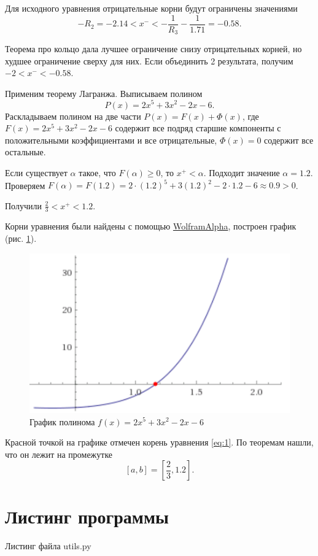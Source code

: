 Для исходного уравнения отрицательные корни будут ограничены значениями
$$- R_2 =
- 2.14 <
x^{-} <
- \frac{1}{R_3} 
- \frac{1}{1.71} =
- 0.58.$$

Теорема про кольцо дала лучшее ограничение снизу отрицательных корней, но худшее ограничение сверху для них.
Если объединить 2 результата, получим $- 2 < x^{-} < - 0.58$.

Применим теорему Лагранжа.
Выписываем полином
$$P \left( x \right) = 2x^5 + 3x^2 - 2x - 6.$$
Раскладываем полином на две части $P \left( x \right) = F \left( x \right) + \Phi \left( x \right) $,
где $F \left( x \right) = 2x^5 + 3x^2 - 2x - 6$ содержит все подряд старшие компоненты с положительными коэффициентами и все отрицательные,
$ \Phi \left( x \right) = 0$ содержит все остальные.

Если существует $ \alpha $ такое, что $F \left( \alpha \right) \geq 0$, то $x^{+} < \alpha $.
Подходит значение $ \alpha = 1.2$.
Проверяем
$F \left( \alpha \right) =
F \left( 1.2 \right) =
2 \cdot \left( 1.2 \right)^5 + 3 \left( 1.2 \right)^2 - 2 \cdot 1.2 - 6 \approx 0.9 > 0$.

Получили $ \frac{2}{3} < x^{+} < 1.2$.

Корни уравнения были найдены с помощью \href{http://www.wolframalpha.com}{WolframAlpha}, построен график (рис. \ref{fig:plot}).

\begin{figure}[h!]
  \centering
  \includegraphics[width=.3\textwidth]{plot.png}
  \caption{График полинома $f \left( x \right) = 2x^5 + 3x^2 - 2x - 6$}
\label{fig:plot}
\end{figure}

Красной точкой на графике отмечен корень уравнения \ref{eq:1}.
По теоремам нашли, что он лежит на промежутке
$$ \left[ a, b \right] = \left[ \frac{2}{3}, 1.2 \right].$$

\chapter{Листинг программы}

Листинг файла utils.py
\lstset{inputencoding=utf8, extendedchars=\true}



